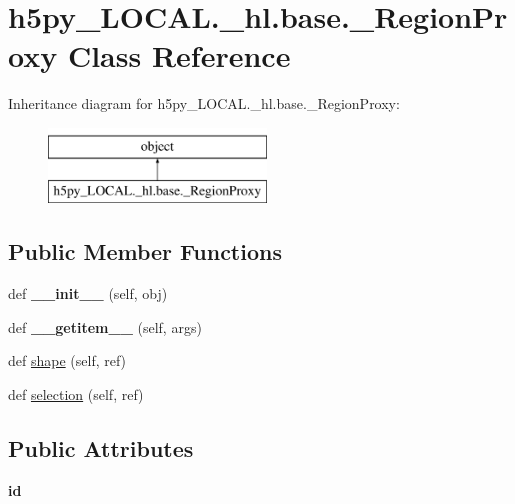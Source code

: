 \hypertarget{classh5py__LOCAL_1_1__hl_1_1base_1_1__RegionProxy}{}\section{h5py\+\_\+\+L\+O\+C\+A\+L.\+\_\+hl.\+base.\+\_\+\+Region\+Proxy Class Reference}
\label{classh5py__LOCAL_1_1__hl_1_1base_1_1__RegionProxy}
Inheritance diagram for h5py\+\_\+\+L\+O\+C\+A\+L.\+\_\+hl.\+base.\+\_\+\+Region\+Proxy\+:\begin{figure}[H]
\begin{center}
\leavevmode
\includegraphics[height=2.000000cm]{classh5py__LOCAL_1_1__hl_1_1base_1_1__RegionProxy}
\end{center}
\end{figure}
\subsection*{Public Member Functions}
\begin{DoxyCompactItemize}
\item 
\mbox{\label{classh5py__LOCAL_1_1__hl_1_1base_1_1__RegionProxy_a36a17c55284af7b76eee3d439c00a9c8}} 
def {\bfseries \+\_\+\+\_\+init\+\_\+\+\_\+} (self, obj)
\item 
\mbox{\label{classh5py__LOCAL_1_1__hl_1_1base_1_1__RegionProxy_a59896f9eb3fc267fe886fbbd42c1a1fd}} 
def {\bfseries \+\_\+\+\_\+getitem\+\_\+\+\_\+} (self, args)
\item 
def \hyperlink{classh5py__LOCAL_1_1__hl_1_1base_1_1__RegionProxy_ae8e1aa2336abe157428758c46581c70f}{shape} (self, ref)
\item 
def \hyperlink{classh5py__LOCAL_1_1__hl_1_1base_1_1__RegionProxy_a40cd1dbb42844bffac84c15482f763ce}{selection} (self, ref)
\end{DoxyCompactItemize}
\subsection*{Public Attributes}
\begin{DoxyCompactItemize}
\item 
\mbox{\label{classh5py__LOCAL_1_1__hl_1_1base_1_1__RegionProxy_ae3fd2164b9aba566106509c731f67aa3}} 
{\bfseries id}
\end{DoxyCompactItemize}


